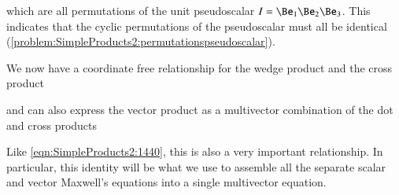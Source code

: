 which are all permutations of the  unit pseudoscalar \( I = \Be_1 \Be_2 \Be_3 \).
This indicates that the cyclic permutations of the  pseudoscalar must all be identical (\cref{problem:SimpleProducts2:permutationspseudoscalar}).

We now have a coordinate free relationship for the  wedge product and the cross product


and can also express the
 vector product as a multivector combination of the dot and cross products


Like
\cref{eqn:SimpleProducts2:1440}, this is also a very important relationship.
In particular, this identity will be what we use to assemble all the separate scalar and vector Maxwell's equations into a single multivector equation.



